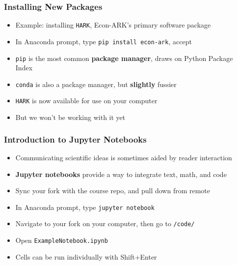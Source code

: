 \documentclass[aspectratio=169]{beamer}
\begin{document}

\begin{frame}
\frametitle{Installing New Packages}
\begin{itemize}
\item Example: installing \texttt{HARK}, Econ-ARK's primary software package

\item In Anaconda prompt, type \texttt{pip install econ-ark}, accept

\item <2->\texttt{pip} is the most common \textbf{package manager}, draws on Python Package Index

\item <2->\texttt{conda} is also a package manager, but \textbf{slightly} fussier

\item <3->\texttt{HARK} is now available for use on your computer

\item <3->But we won't be working with it yet
\end{itemize}
\end{frame}



\begin{frame}
\frametitle{Introduction to Jupyter Notebooks}
\begin{itemize}
	\item Communicating scientific ideas is sometimes aided by reader interaction
	
	\item \textbf{Jupyter notebooks} provide a way to integrate text, math, and code
	
	\item <2->Sync your fork with the course repo, and pull down from remote
	
	\item <3->In Anaconda prompt, type \texttt{jupyter notebook}
	
	\item <3->Navigate to your fork on your computer, then go to \texttt{/code/}
	
	\item <3->Open \texttt{ExampleNotebook.ipynb}
	
	\item <4->Cells can be run individually with Shift+Enter
\end{itemize}
\end{frame}
\end{document}
